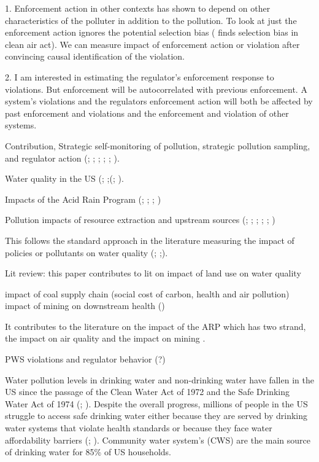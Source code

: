\documentclass{article}
\begin{document}
1. Enforcement action in other contexts has shown to depend on other characteristics of the polluter in addition to the pollution. To look at just the enforcement action ignores the potential selection bias (\cite{hanna2010impact} finds selection bias in clean air act). We can measure impact of enforcement action or violation after convincing causal identification of the violation.

2. I am interested in estimating the regulator's enforcement response to violations. But enforcement will be autocorrelated with previous enforcement. A system's violations and the regulators enforcement action will both be affected by past enforcement and violations and the enforcement and violation of other systems. 

Contribution, 
Strategic self-monitoring of pollution, strategic pollution sampling, and regulator action (\cite{helland1998enforcement}; \cite{stafford2002effect}; \cite{bennear2009sampling}; \cite{duflo2013truth}; \cite{duflo2018value}; \cite{mu2024s}). 
    
Water quality in the US (\cite{bennear2008impacts}; \cite{zivin2011water};\cite{allaire2018national}(\cite{keiser2019us}; \cite{keiser2023us}).
    
Impacts of the Acid Rain Program (\cite{schmalensee2013so2}; \cite{chan2018impact}; \cite{busse2007market}; \cite{li2024effect})
    
Pollution impacts of resource extraction and upstream sources (\cite{aragon2016polluting}; \cite{chu2023air}; \cite{sigman2002international}; \cite{somerville2025impact}; \cite{lutz2013environmental}; 
    \cite{hill2017shale})

This follows the standard approach in the literature measuring the impact of policies or pollutants on water quality (\cite{keiser}; \cite{keiser};\cite{china cancer upstream}). 


Lit review:
this paper contributes to lit on impact of land use on water quality \cite{somerville2025impact}

impact of coal supply chain (social cost of carbon, health and air pollution)
impact of mining on downstream health (\cite{parfitt2024there})

It contributes to the literature on the impact of the ARP which has two strand, the impact on air quality and the impact on mining \cite{li2024effect}.

PWS violations and regulator behavior (?)

Water pollution levels in drinking water and non-drinking water have fallen in the US since the passage of the Clean Water Act of 1972 and the Safe Drinking Water Act of 1974 (\cite{keiser2019us}; \cite{keiser2023us}). Despite the overall progress, millions of people in the US struggle to access safe drinking water either because they are served by drinking water systems that violate health standards or because they face water affordability barriers (\cite{allaire2018national}; \cite{cardoso2022water}). Community water system's (CWS) are the main source of drinking water for 85\% of US households.
\end{document}
